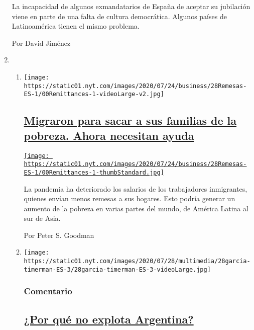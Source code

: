 \begin{enumerate}
  La incapacidad de algunos exmandatarios de España de aceptar su
  jubilación viene en parte de una falta de cultura democrática. Algunos
  países de Latinoamérica tienen el mismo problema.

  Por David Jiménez
\item
  \begin{enumerate}
  \def\labelenumii{\arabic{enumii}.}
  \item
    \texttt{[image: https://static01.nyt.com/images/2020/07/24/business/28Remesas-ES-1/00Remittances-1-videoLarge-v2.jpg]}

    \hypertarget{migraron-para-sacar-a-sus-familias-de-la-pobreza-ahora-necesitan-ayuda}{%
    \subsection{\texorpdfstring{\href{/es/2020/07/28/espanol/mundo/remesas-coronavirus.html}{Migraron
    para sacar a sus familias de la pobreza. Ahora necesitan
    ayuda}}{Migraron para sacar a sus familias de la pobreza. Ahora necesitan ayuda}}\label{migraron-para-sacar-a-sus-familias-de-la-pobreza-ahora-necesitan-ayuda}}

    \href{/es/2020/07/28/espanol/mundo/remesas-coronavirus.html}{\texttt{[image: https://static01.nyt.com/images/2020/07/24/business/28Remesas-ES-1/00Remittances-1-thumbStandard.jpg]}}

    La pandemia ha deteriorado los salarios de los trabajadores
    inmigrantes, quienes envían menos remesas a sus hogares. Esto podría
    generar un aumento de la pobreza en varias partes del mundo, de
    América Latina al sur de Asia.

    Por Peter S. Goodman
  \item
    \texttt{[image: https://static01.nyt.com/images/2020/07/28/multimedia/28garcia-timerman-ES-3/28garcia-timerman-ES-3-videoLarge.jpg]}

    \hypertarget{comentario-1}{%
    \subsubsection{Comentario}\label{comentario-1}}

    \hypertarget{por-quuxe9-no-explota-argentina}{%
    \subsection{\texorpdfstring{\href{/es/2020/07/28/espanol/opinion/argentina-estallido-2001-coronavirus.html}{¿Por
    qué no explota
    Argentina?}}{¿Por qué no explota Argentina?}}\label{por-quuxe9-no-explota-argentina}}


\end{enumerate}
\end{enumerate}

